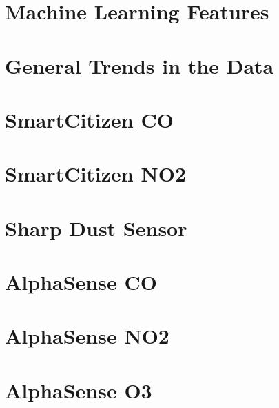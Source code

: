 \section{Machine Learning Features}

\FloatBarrier

\section{General Trends in the Data}

\FloatBarrier

\section{SmartCitizen CO}

\FloatBarrier

\section{SmartCitizen NO2}

\FloatBarrier

\section{Sharp Dust Sensor}

\FloatBarrier

\section{AlphaSense CO}

\FloatBarrier

\section{AlphaSense NO2}

\FloatBarrier

\section{AlphaSense O3}

\FloatBarrier


%

